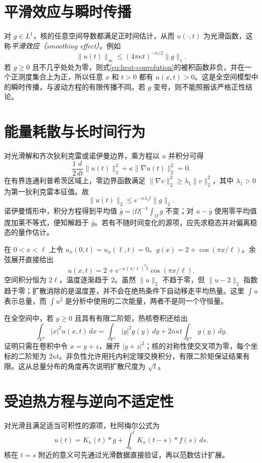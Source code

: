 \section{平滑效应与瞬时传播}
对 $g\in L^1$，核的任意空间导数都满足正时间估计，从而 $u(\cdot,t)$ 为光滑函数，这称\emph{平滑效应（smoothing effect）}。例如
\[
 \|u(t)\|_\infty\le(4\pi\kappa t)^{-n/2}\|g\|_1.
\]
若 $g\ge0$ 且不几乎处处为零，则式\eqref{eq:heat-convolution}的被积函数非负，并在一个正测度集合上为正，所以任意 $x$ 和 $t>0$ 都有 $u(x,t)>0$。这是全空间模型中的瞬时传播，与波动方程的有限传播不同。若 $g$ 变号，则不能照搬该严格正性结论。

\section{能量耗散与长时间行为}
对光滑解和齐次狄利克雷或诺伊曼边界，乘方程以 $u$ 并积分可得
\begin{equation}
 \frac12\frac d{dt}\|u(t)\|_2^2+\kappa\|\nabla u(t)\|_2^2=0.
 \label{eq:heat-energy}
\end{equation}
在有界连通利普希茨区域上，零边界函数满足 $\|\nabla v\|_2^2\ge\lambda_1\|v\|_2^2$，其中 $\lambda_1>0$ 为第一狄利克雷本征值。故
\[
 \|u(t)\|_2\le e^{-\kappa\lambda_1t}\|g\|_2.
\]
诺伊曼情形中，积分方程得到平均值 $\bar g=|\Omega|^{-1}\int_\Omega g$ 不变；对 $u-\bar g$ 使用零平均值庞加莱不等式，便知解趋于 $\bar g$。若有不随时间变化的源项，应先求稳态并对偏离稳态的量作估计。

\begin{example}[绝热杆的长期温度]
在 $0<x<\ell$ 上令 $u_x(0,t)=u_x(\ell,t)=0$、$g(x)=2+\cos(\pi x/\ell)$。余弦展开直接给出
\[
 u(x,t)=2+e^{-\kappa(\pi/\ell)^2t}\cos(\pi x/\ell).
\]
空间积分恒为 $2\ell$，温度逐渐趋于 $2$。虽然 $\|u\|_2$ 不趋于零，但 $\|u-2\|_2$ 指数趋于零；扩散消除的是温度差，并不会在绝热条件下自动移走平均热量。这里 $\int u$ 表示总量，而 $\int u^2$ 是分析中使用的二次能量，两者不是同一个守恒量。
\end{example}

在全空间中，若 $g\ge0$ 且具有有限二阶矩，热核卷积还给出
\[
 \int_{\mathbb R^n}|x|^2u(x,t)\,dx
 =\int_{\mathbb R^n}|y|^2g(y)\,dy+2n\kappa t\int_{\mathbb R^n}g(y)\,dy.
\]
证明只需在卷积中令 $x=y+z$，展开 $|y+z|^2$；核的对称性使交叉项为零，每个坐标的二阶矩为 $2\kappa t$。非负性允许用托内利定理交换积分，有限二阶矩保证结果有限。这从总量分布的角度再次说明扩散尺度为 $\sqrt t$。

\section{受迫热方程与逆向不适定性}
对光滑且满足适当可积性的源项，杜阿梅尔公式为
\[
 u(t)=K_\kappa(t)*g+\int_0^t K_\kappa(t-s)*f(s)\,ds.
\]
核在 $t=s$ 附近的意义可先通过光滑数据直接验证，再以范数估计扩展。

